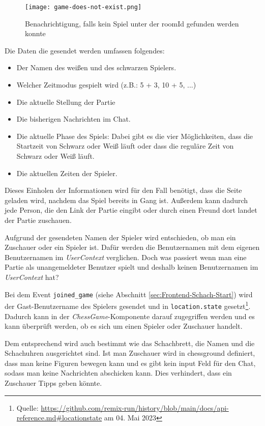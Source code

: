 \begin{figure}[h]
\centering
\texttt{[image: game-does-not-exist.png]}
\caption{Benachrichtigung, falls kein Spiel unter der roomId gefunden werden konnte}
\label{fig:game-does-not-exist}
\end{figure}

Die Daten die gesendet werden umfassen folgendes:
\begin{itemize}
\item Der Namen des weißen und des schwarzen Spielers.
\item Welcher Zeitmodus gespielt wird (z.B.: 5 + 3, 10 + 5, ...)
\item Die aktuelle Stellung der Partie
\item Die bisherigen Nachrichten im Chat.
\item Die aktuelle Phase des Spiels: Dabei gibt es die vier Möglichkeiten, dass die Startzeit von Schwarz oder Weiß läuft oder dass die reguläre Zeit von Schwarz oder Weiß läuft.
\item Die aktuellen Zeiten der Spieler.
\end{itemize}
Dieses Einholen der Informationen wird für den Fall benötigt, dass die Seite geladen wird, nachdem das Spiel bereits in Gang ist. Außerdem kann dadurch jede Person, die den Link der Partie eingibt oder durch einen Freund dort landet der Partie zuschauen.

Aufgrund der gesendeten Namen der Spieler wird entschieden, ob man ein Zuschauer oder ein Spieler ist.  Dafür werden die Benutzernamen mit dem eigenen Benutzernamen im \textit{UserContext} verglichen. Doch was passiert wenn man eine Partie als unangemeldeter Benutzer spielt und deshalb keinen Benutzernamen im \textit{UserContext} hat?

Bei dem Event \verb|joined_game| (siehe Abschnitt \ref{sec:Frontend-Schach-Start}) wird der Gast-Benutzername des Spielers gesendet und in \verb|location.state| gesetzt\footnote{Quelle: \url{https://github.com/remix-run/history/blob/main/docs/api-reference.md\#locationstate} am 04. Mai 2023}. Dadurch kann in der \textit{ChessGame}-Komponente darauf zugegriffen werden und es kann überprüft werden, ob es sich um einen Spieler oder Zuschauer handelt.


Dem entsprechend wird auch bestimmt wie das Schachbrett, die Namen und die Schachuhren ausgerichtet sind. Ist man Zuschauer wird in chessground definiert, dass man keine Figuren bewegen kann und es gibt kein input Feld für den Chat, sodass man keine Nachrichten abschicken kann. Dies verhindert, dass ein Zuschauer Tipps geben könnte.

